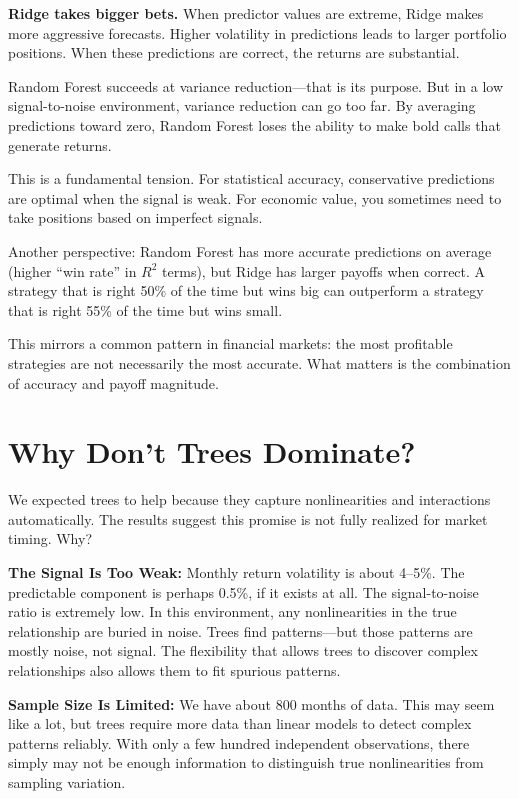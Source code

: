 \documentclass[11pt,a4paper]{article}
\begin{document}
\textbf{Ridge takes bigger bets.} When predictor values are extreme, Ridge makes more aggressive forecasts. Higher volatility in predictions leads to larger portfolio positions. When these predictions are correct, the returns are substantial.

Random Forest succeeds at variance reduction---that is its purpose. But in a low signal-to-noise environment, variance reduction can go too far. By averaging predictions toward zero, Random Forest loses the ability to make bold calls that generate returns.

This is a fundamental tension. For statistical accuracy, conservative predictions are optimal when the signal is weak. For economic value, you sometimes need to take positions based on imperfect signals.

Another perspective: Random Forest has more accurate predictions on average (higher ``win rate'' in $R^2$ terms), but Ridge has larger payoffs when correct. A strategy that is right 50\% of the time but wins big can outperform a strategy that is right 55\% of the time but wins small.

This mirrors a common pattern in financial markets: the most profitable strategies are not necessarily the most accurate. What matters is the combination of accuracy and payoff magnitude.

\section{Why Don't Trees Dominate?}

We expected trees to help because they capture nonlinearities and interactions automatically. The results suggest this promise is not fully realized for market timing. Why?

\textbf{The Signal Is Too Weak:} Monthly return volatility is about 4--5\%. The predictable component is perhaps 0.5\%, if it exists at all. The signal-to-noise ratio is extremely low. In this environment, any nonlinearities in the true relationship are buried in noise. Trees find patterns---but those patterns are mostly noise, not signal. The flexibility that allows trees to discover complex relationships also allows them to fit spurious patterns.

\textbf{Sample Size Is Limited:} We have about 800 months of data. This may seem like a lot, but trees require more data than linear models to detect complex patterns reliably. With only a few hundred independent observations, there simply may not be enough information to distinguish true nonlinearities from sampling variation.
\end{document}
